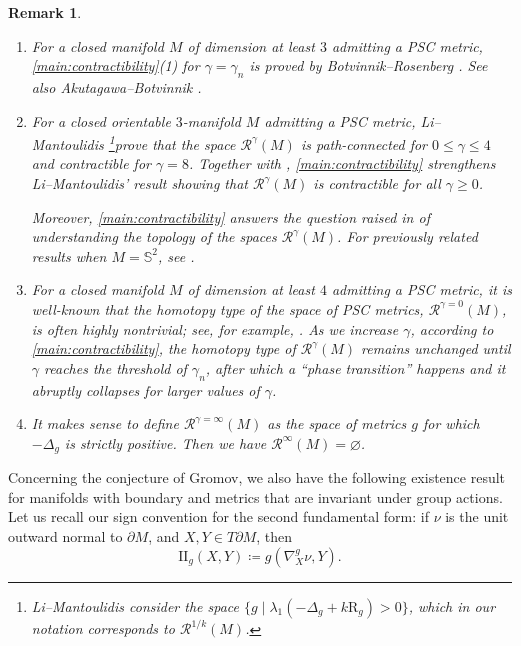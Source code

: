 \documentclass[11pt]{amsart}
\numberwithin{equation}{section}
\newtheorem{remark}[theorem]{Remark}
\newcommand{\Riem}{\mathcal{R}}
\newcommand{\scal}{\mathrm{R}}
\let\ge\geqslant
\let\le\leqslant
\begin{document}
\begin{remark}\leavevmode
\begin{enumerate}
\item[a)] For a closed manifold $M$ of dimension at least $3$ admitting a PSC metric, \cref{main:contractibility}(1) for $\gamma = \gamma_n$ is proved by Botvinnik--Rosenberg \cite[Theorem 3.4]{BotRos}. See also Akutagawa--Botvinnik \cite[Theorem 7.1]{AkutagawaBotvinnik-relative-yamabe-invariant}.
\item [b)] For a closed orientable  $3$-manifold $M$ admitting a PSC metric,
    Li--Mantoulidis \cite[Theorems 1.3--1.4]{LiMantoulidis2023}\footnote{
        Li--Mantoulidis consider the space $\{g \mid \lambda_1(-\Delta_g+k\scal_g)>0\}$, which in our notation corresponds to $\Riem^{1/k}(M)$.
      }prove that the space $\Riem^\gamma(M)$ is path-connected for $0\le\gamma\le4$ and contractible for $\gamma=8$.
    Together with \cite[Theorem 1.1]{BamlerKleiner2019}, \cref{main:contractibility} strengthens Li--Mantoulidis' result showing that $\Riem^\gamma(M)$ is contractible for all $\gamma \ge 0$. 
    
    Moreover, \cref{main:contractibility} answers the question raised in
\cite[p. 1833]{LiMantoulidis2023} of understanding the topology of the spaces $\mathcal{R}^\gamma(M)$. For previously related results when $M=\mathbb S^2$, see \cite{MantoulidisSchoen2015}.
\item [c)] For a closed manifold $M$  of dimension at least $4$ admitting a PSC metric, it is well-known that the homotopy type of the space of PSC metrics, $\Riem^{\gamma = 0}(M)$, is often highly nontrivial; see, for example,  \cite{BERW, CS, ERW, HSS14, Rub}. 
As we increase $\gamma$, according to \cref{main:contractibility}, the homotopy type of $\Riem^{\gamma}(M)$ remains unchanged until $\gamma$ reaches the threshold of $\gamma_n$, after which a ``phase transition'' happens and it abruptly collapses for larger values of $\gamma$.
\item[d)] It makes sense to define $\Riem^{\gamma = \infty}(M)$ as the space of metrics $g$ for which $- \Delta_g$ is strictly positive. 
Then we have $\Riem^{\infty}(M) = \varnothing$.
\end{enumerate}
\end{remark}   
\smallskip 

Concerning the conjecture of Gromov, we also have the following existence result for manifolds with boundary and  metrics that are invariant under group actions.  
Let us recall our sign convention for the second fundamental form: 
if $\nu$ is the unit outward normal to $\partial M$, and $X,Y\in T\partial M$, then 
\[
\mathrm{II}_g(X,Y)
  \coloneqq g(\nabla^g_X\nu,Y).
\]
\end{document}
